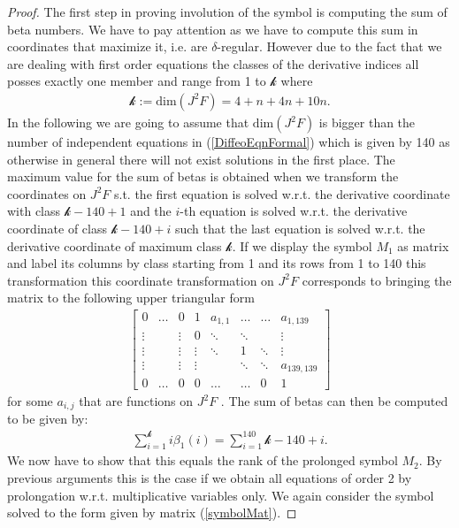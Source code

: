 \documentclass[a4paper,12pt, DIV=14, BCOR=5mm, twoside, headsepline, numbers=noenddot]{scrbook}
\begin{document}
\begin{proof}
The first step in proving involution of the symbol is computing the sum of beta numbers. We have to pay attention as we have to compute this sum in coordinates that maximize it, i.e. are $\delta$-regular. However due to the fact that we are dealing with first order equations the classes of the derivative indices all posses exactly one member and range from 1 to $\mathcal{k}$ where 
\begin{align}
    \mathcal{k} := \mathrm{dim}(J^2F) = 4+n+4n+10n.
\end{align}
In the following we are going to assume that $\mathrm{dim}(J^2F)$ is bigger than the number of independent equations in (\ref{DiffeoEqnFormal}) which is given by 140 as otherwise in general there will not exist solutions in the first place. 
The maximum value for the sum of betas is obtained when we transform the coordinates on $J^2F$ s.t. the first equation is solved w.r.t. the derivative coordinate with class $\mathcal{k}-140+1$ and the $i$-th equation is solved w.r.t. the derivative coordinate of class $\mathcal{k}-140+i$ such that the last equation is solved w.r.t. the derivative coordinate of maximum class $\mathcal{k}$. If we display the symbol $M_1$ as matrix and label its columns by class starting from 1 and its rows from 1 to 140 this transformation this coordinate transformation on $J^2F$ corresponds to bringing the matrix to the following upper triangular form
\begin{align}\label{symbolMat}
\begin{bmatrix} 
      0 & \hdots & 0 & 1 & a_{1,1} & \hdots & \hdots & a_{1,139} \\
      \vdots &  & \vdots & 0 & \ddots & \ddots & & \vdots  \\
      \vdots & & \vdots & \vdots & \ddots  & 1 & \ddots & \vdots  \\
      \vdots & & \vdots & \vdots & & \ddots & \ddots & a_{139,139} \\
      0 & \hdots & 0 & 0 & \hdots  & \hdots & 0 & 1
\end{bmatrix}
\end{align}
for some $a_{i,j}$ that are functions on $J^2F$ . The sum of betas can then be computed to be given by:
\begin{align}
    \sum_{i=1}^{\mathcal{k}} i \beta_1(i) = \sum_{i = 1}^{140} \mathcal{k} -140+i.
\end{align}
We now have to show that this equals the rank of the prolonged symbol $M_2$. By previous arguments this is the case if we obtain all equations of order 2 by prolongation w.r.t. multiplicative variables only. We again consider the symbol solved to the form given by matrix (\ref{symbolMat}). 

\end{proof}
\end{document}
